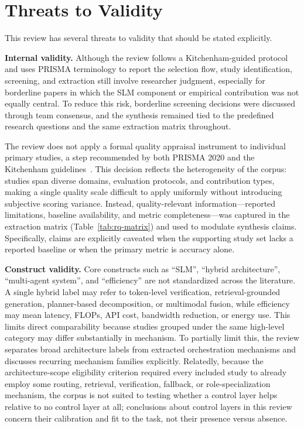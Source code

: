\section{Threats to Validity}
\label{sec:threats}
This review has several threats to validity that should be stated explicitly.

\textbf{Internal validity.} Although the review follows a Kitchenham-guided protocol and uses PRISMA terminology to report the selection flow, study identification, screening, and extraction still involve researcher judgment, especially for borderline papers in which the SLM component or empirical contribution was not equally central. To reduce this risk, borderline screening decisions were discussed through team consensus, and the synthesis remained tied to the predefined research questions and the same extraction matrix throughout.

The review does not apply a formal quality appraisal instrument to individual primary studies, a step recommended by both PRISMA 2020 and the Kitchenham guidelines~\cite{kitchenham2007guidelines}. This decision reflects the heterogeneity of the corpus: studies span diverse domains, evaluation protocols, and contribution types, making a single quality scale difficult to apply uniformly without introducing subjective scoring variance. Instead, quality-relevant information---reported limitations, baseline availability, and metric completeness---was captured in the extraction matrix (Table~\ref{tab:rq-matrix}) and used to modulate synthesis claims. Specifically, claims are explicitly caveated when the supporting study set lacks a reported baseline or when the primary metric is accuracy alone.

\textbf{Construct validity.} Core constructs such as ``SLM'', ``hybrid architecture'', ``multi-agent system'', and ``efficiency'' are not standardized across the literature. A single hybrid label may refer to token-level verification, retrieval-grounded generation, planner-based decomposition, or multimodal fusion, while efficiency may mean latency, FLOPs, API cost, bandwidth reduction, or energy use. This limits direct comparability because studies grouped under the same high-level category may differ substantially in mechanism. To partially limit this, the review separates broad architecture labels from extracted orchestration mechanisms and discusses recurring mechanism families explicitly. Relatedly, because the architecture-scope eligibility criterion required every included study to already employ some routing, retrieval, verification, fallback, or role-specialization mechanism, the corpus is not suited to testing whether a control layer helps relative to no control layer at all; conclusions about control layers in this review concern their calibration and fit to the task, not their presence versus absence.

